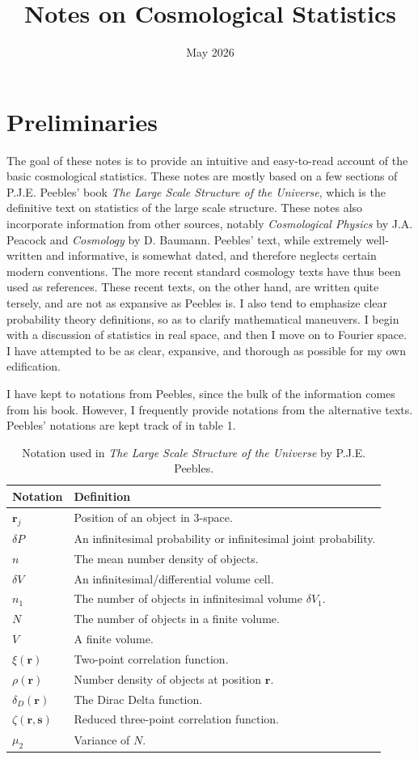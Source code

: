 \documentclass{article}
\title{\bfseries Notes on Cosmological Statistics}
\date{May 2026}
\begin{document}
\maketitle

\section{Preliminaries}
The goal of these notes is to provide an intuitive and easy-to-read account of the basic cosmological statistics. 
These notes are mostly based on a few sections of P.J.E. Peebles' book \textit{The Large Scale Structure of the Universe}, which is the definitive text on statistics of the large scale structure. 
These notes also incorporate information from other sources, notably \textit{Cosmological Physics} by J.A. Peacock and \textit{Cosmology} by D. Baumann.
Peebles' text, while extremely well-written and informative, is somewhat dated, and therefore neglects certain modern conventions.
The more recent standard cosmology texts have thus been used as references.
These recent texts, on the other hand, are written quite tersely, and are not as expansive as Peebles is.
I also tend to emphasize clear probability theory definitions, so as to clarify mathematical maneuvers.
I begin with a discussion of statistics in real space, and then I move on to Fourier space.
I have attempted to be as clear, expansive, and thorough as possible for my own edification.

I have kept to notations from Peebles, since the bulk of the information comes from his book. However, I frequently provide notations from the alternative texts. Peebles' notations are kept track of in table 1.
\begin{table}[h]
\centering
\begin{tabular}{l p{10cm}}
\toprule
Notation & Definition \\
\midrule
$\mathbf{r}_j$ & Position of an object in 3-space.\\
$\delta P$ & An infinitesimal probability or infinitesimal joint probability.\\
$n$ & The mean number density of objects.\\
$\delta V$ & An infinitesimal/differential volume cell.\\
$n_1$ & The number of objects in infinitesimal volume $\delta V_1$.\\
$N$ & The number of objects in a finite volume.\\
$V$ & A finite volume.\\
$\xi(\mathbf{r})$ & Two-point correlation function. \\
$\rho(\mathbf{r})$ & Number density of objects at position $\mathbf{r}$. \\
$\delta_D(\mathbf{r})$ & The Dirac Delta function.\\
$\zeta(\mathbf{r},\mathbf{s})$ & Reduced three-point correlation function. \\
$\mu_2$ & Variance of $N$.\\
\bottomrule
\end{tabular}
\caption{Notation used in \textit{The Large Scale Structure of the Universe} by P.J.E. Peebles.}
\label{tab:notation}
\end{table}
\end{document}
